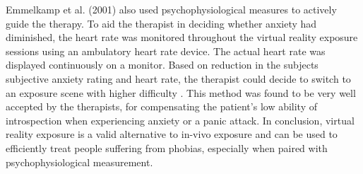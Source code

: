 Emmelkamp et al. (2001) also used psychophysiological measures to actively guide the therapy. To aid the therapist in deciding whether anxiety had diminished, the heart rate was monitored throughout the virtual reality exposure sessions using an ambulatory heart rate device. The actual heart rate was displayed continuously on a monitor. Based on reduction in the subjects subjective anxiety rating and heart rate, the therapist could decide to switch to an exposure scene with higher difficulty \cite{EMMELKAMP2001}. This method was found to be very well accepted by the therapists, for compensating the patient's low ability of introspection when experiencing anxiety or a panic attack. 
In conclusion, virtual reality exposure is a valid alternative to in-vivo exposure and can be used to efficiently treat people suffering from phobias, especially when paired with psychophysiological measurement.
 

